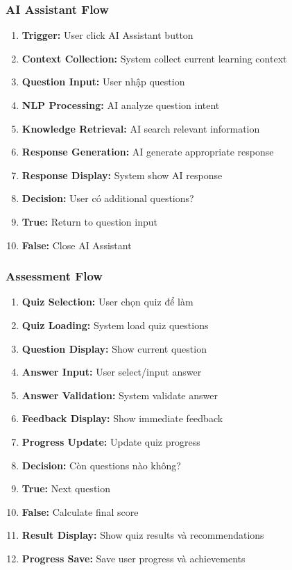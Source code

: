 \subsubsection{AI Assistant Flow}
\begin{enumerate}
    \item \textbf{Trigger:} User click AI Assistant button
    \item \textbf{Context Collection:} System collect current learning context
    \item \textbf{Question Input:} User nhập question
    \item \textbf{NLP Processing:} AI analyze question intent
    \item \textbf{Knowledge Retrieval:} AI search relevant information
    \item \textbf{Response Generation:} AI generate appropriate response
    \item \textbf{Response Display:} System show AI response
    \item \textbf{Decision:} User có additional questions?
    \item \textbf{True:} Return to question input
    \item \textbf{False:} Close AI Assistant
\end{enumerate}

\subsubsection{Assessment Flow}
\begin{enumerate}
    \item \textbf{Quiz Selection:} User chọn quiz để làm
    \item \textbf{Quiz Loading:} System load quiz questions
    \item \textbf{Question Display:} Show current question
    \item \textbf{Answer Input:} User select/input answer
    \item \textbf{Answer Validation:} System validate answer
    \item \textbf{Feedback Display:} Show immediate feedback
    \item \textbf{Progress Update:} Update quiz progress
    \item \textbf{Decision:} Còn questions nào không?
    \item \textbf{True:} Next question
    \item \textbf{False:} Calculate final score
    \item \textbf{Result Display:} Show quiz results và recommendations
    \item \textbf{Progress Save:} Save user progress và achievements
\end{enumerate}

